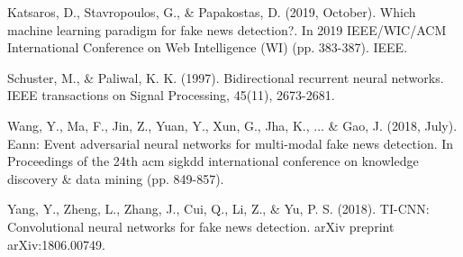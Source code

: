 \documentclass{article}
\begin{document}
\begin{multicols}{2}
Katsaros, D., Stavropoulos, G., \& Papakostas, D. (2019, October). Which machine learning paradigm for fake news detection?. In 2019 IEEE/WIC/ACM International Conference on Web Intelligence (WI) (pp. 383-387). IEEE.

Schuster, M., \& Paliwal, K. K. (1997). Bidirectional recurrent neural networks. IEEE transactions on Signal Processing, 45(11), 2673-2681.

Wang, Y., Ma, F., Jin, Z., Yuan, Y., Xun, G., Jha, K., ... \& Gao, J. (2018, July). Eann: Event adversarial neural networks for multi-modal fake news detection. In Proceedings of the 24th acm sigkdd international conference on knowledge discovery & data mining (pp. 849-857).

Yang, Y., Zheng, L., Zhang, J., Cui, Q., Li, Z., \& Yu, P. S. (2018). TI-CNN: Convolutional neural networks for fake news detection. arXiv preprint arXiv:1806.00749.

\end{multicols}
\end{document}
